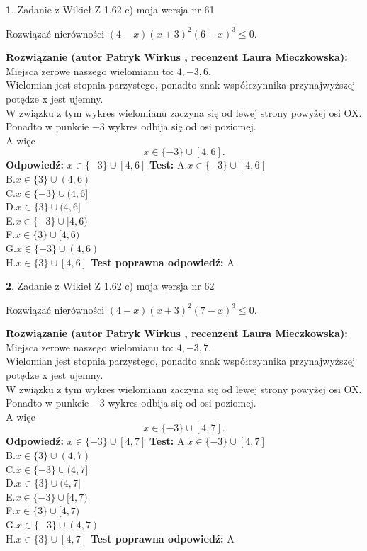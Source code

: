 \documentclass[12pt, a4paper]{article}
\theoremstyle{definition} %
\newtheorem{zad}{}
\newcommand{\zadStart}[1]{\begin{zad}#1\newline}
\newcommand{\zadStop}{\end{zad}}
\newcommand{\rozwStart}[2]{\noindent \textbf{Rozwiązanie (autor #1 , recenzent #2): }\newline}
\newcommand{\rozwStop}{\newline}
\newcommand{\odpStart}{\noindent \textbf{Odpowiedź:}\newline}
\newcommand{\odpStop}{\newline}
\newcommand{\testStart}{\noindent \textbf{Test:}\newline}
\newcommand{\testStop}{\newline}
\newcommand{\kluczStart}{\noindent \textbf{Test poprawna odpowiedź:}\newline}
\newcommand{\kluczStop}{\newline}
\begin{document}
\zadStart{Zadanie z Wikieł Z 1.62 c) moja wersja nr 61}

Rozwiązać nierówności $(4-x)(x+3)^{2}(6-x)^{3}\le0$.
\zadStop
\rozwStart{Patryk Wirkus}{Laura Mieczkowska}
Miejsca zerowe naszego wielomianu to: $4, -3, 6$.\\
Wielomian jest stopnia parzystego, ponadto znak współczynnika przy\linebreak najwyższej potędze x jest ujemny.\\ W związku z tym wykres wielomianu zaczyna się od lewej strony powyżej osi OX.\\
Ponadto w punkcie $-3$ wykres odbija się od osi poziomej.\\
A więc $$x \in \{-3\} \cup [4,6].$$
\rozwStop
\odpStart
$x \in \{-3\} \cup [4,6]$
\odpStop
\testStart
A.$x \in \{-3\} \cup [4,6]$\\
B.$x \in \{3\} \cup (4,6)$\\
C.$x \in \{-3\} \cup (4,6]$\\
D.$x \in \{3\} \cup (4,6]$\\
E.$x \in \{-3\} \cup [4,6)$\\
F.$x \in \{3\} \cup [4,6)$\\
G.$x \in \{-3\} \cup (4,6)$\\
H.$x \in \{3\} \cup [4,6]$
\testStop
\kluczStart
A
\kluczStop



\zadStart{Zadanie z Wikieł Z 1.62 c) moja wersja nr 62}

Rozwiązać nierówności $(4-x)(x+3)^{2}(7-x)^{3}\le0$.
\zadStop
\rozwStart{Patryk Wirkus}{Laura Mieczkowska}
Miejsca zerowe naszego wielomianu to: $4, -3, 7$.\\
Wielomian jest stopnia parzystego, ponadto znak współczynnika przy\linebreak najwyższej potędze x jest ujemny.\\ W związku z tym wykres wielomianu zaczyna się od lewej strony powyżej osi OX.\\
Ponadto w punkcie $-3$ wykres odbija się od osi poziomej.\\
A więc $$x \in \{-3\} \cup [4,7].$$
\rozwStop
\odpStart
$x \in \{-3\} \cup [4,7]$
\odpStop
\testStart
A.$x \in \{-3\} \cup [4,7]$\\
B.$x \in \{3\} \cup (4,7)$\\
C.$x \in \{-3\} \cup (4,7]$\\
D.$x \in \{3\} \cup (4,7]$\\
E.$x \in \{-3\} \cup [4,7)$\\
F.$x \in \{3\} \cup [4,7)$\\
G.$x \in \{-3\} \cup (4,7)$\\
H.$x \in \{3\} \cup [4,7]$
\testStop
\kluczStart
A
\kluczStop
\end{document}
